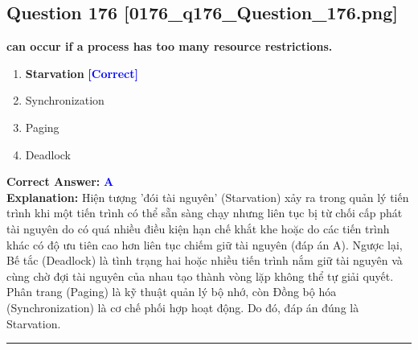 \documentclass[11pt,a4paper]{article}
\begin{document}
\begin{minipage}{\textwidth}
\subsection*{Question 176 \quad \footnotesize{[0176\_q176\_Question\_176.png]}}
\noindent \textbf{can occur if a process has too many resource restrictions.}

\begin{enumerate}[label=\Alph*.]
    \item \textbf{Starvation} \hfill \textcolor{blue}{\textbf{[Correct]}}
    \item Synchronization
    \item Paging
    \item Deadlock
\end{enumerate}

\noindent \textbf{Correct Answer:} \textcolor{blue}{\textbf{A}} \\[2pt]
\noindent \textbf{Explanation:} Hiện tượng 'đói tài nguyên' (Starvation) xảy ra trong quản lý tiến trình khi một tiến trình có thể sẵn sàng chạy nhưng liên tục bị từ chối cấp phát tài nguyên do có quá nhiều điều kiện hạn chế khắt khe hoặc do các tiến trình khác có độ ưu tiên cao hơn liên tục chiếm giữ tài nguyên (đáp án A). Ngược lại, Bế tắc (Deadlock) là tình trạng hai hoặc nhiều tiến trình nắm giữ tài nguyên và cùng chờ đợi tài nguyên của nhau tạo thành vòng lặp không thể tự giải quyết. Phân trang (Paging) là kỹ thuật quản lý bộ nhớ, còn Đồng bộ hóa (Synchronization) là cơ chế phối hợp hoạt động. Do đó, đáp án đúng là Starvation.

\par\vspace{0.3cm}
\hrule
\vspace{0.3cm}
\end{minipage}
\end{document}
